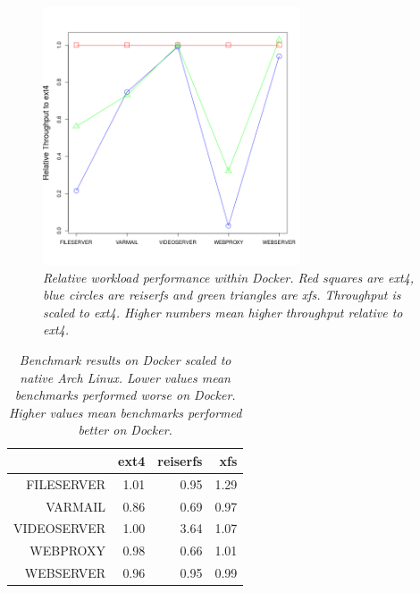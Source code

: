 \documentclass[letterpaper,twocolumn,10pt]{article}
\begin{document}
\begin{figure}[!ht]
\centering
\includegraphics[width=3in]{../results/dock_relative_performance.png}
\caption{\textit{Relative workload performance within Docker. Red squares are ext4, blue circles are reiserfs and green triangles are xfs. Throughput is scaled to ext4. Higher numbers mean higher throughput relative to ext4.}}
\label{fig:dock_relative_performance}
\end{figure}

\begin{table}[!ht]
\centering
\begin{tabular}{rrrr}
  \hline
 & ext4 & reiserfs & xfs \\ 
  \hline
FILESERVER & 1.01 & 0.95 & 1.29 \\ 
  VARMAIL & 0.86 & 0.69 & 0.97 \\ 
  VIDEOSERVER & 1.00 & 3.64 & 1.07 \\ 
  WEBPROXY & 0.98 & 0.66 & 1.01 \\ 
  WEBSERVER & 0.96 & 0.95 & 0.99 \\ 
   \hline
\end{tabular}
\caption{\textit{Benchmark results on Docker scaled to native Arch Linux. Lower values mean benchmarks performed worse on Docker. Higher values mean benchmarks performed better on Docker.}}
\label{tab:dock_relative_arch}
\end{table}
\end{document}
